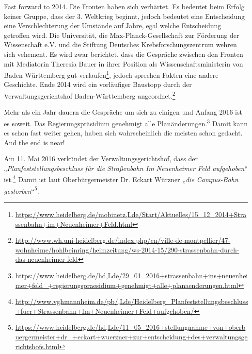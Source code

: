 Fast forward to 2014. Die Fronten haben sich verhärtet. Es bedeutet beim Erfolg keiner Gruppe, dass der 3. Weltkrieg beginnt, jedoch bedeutet eine Entscheidung eine Verschlechterung der Umstände auf Jahre, egal welche Entscheidung getroffen wird. Die Universität, die Max-Planck-Gesellschaft zur Förderung der Wissenschaft e.V. und die Stiftung Deutsches Krebsforschungszentrum wehren sich vehement. Es wird zwar berichtet, dass die Gespräche zwischen den Fronten mit Mediatorin Theresia Bauer in ihrer Position als Wissenschaftsministerin von Baden-Württemberg gut verlaufen\footnote{\url{https://www.heidelberg.de/mobinetz,Lde/Start/Aktuelles/15_12_2014+Strassenbahn+im+Neuenheimer+Feld.html}}, jedoch sprechen Fakten eine andere Geschichte. Ende 2014 wird ein vorläufiger Baustopp durch der Verwaltungsgerichtshof Baden-Württemberg angeordnet.\footnote{\url{http://www.wh.uni-heidelberg.de/index.php/en/ville-de-montpellier/47-wohnheime/hohlbeinring/heimzeitung/ws-2014-15/290-strassenbahn-durch-das-neuenheimer-feld}}

Mehr als ein Jahr dauern die Gespräche um sich zu einigen und Anfang 2016 ist es soweit. Das Regierungspräsidium genehmigt alle Planänderungen.\footnote{\url{https://www.heidelberg.de/hd,Lde/29_01_2016+strassenbahn+ins+neuenheimer+feld_+regierungspraesidium+genehmigt+alle+planaenderungen.html}} Damit kann es schon fast weiter gehen, haben sich wahrscheinlich die meisten schon gedacht. And the end is near!

Am 11. Mai 2016 verkündet der Verwaltungsgerichtshof, dass der „\textit{Planfeststellungsbeschluss für die Straßenbahn Im Neuenheimer Feld aufgehoben}“ ist.\footnote{\url{http://www.vghmannheim.de/pb/,Lde/Heidelberg_Planfeststellungsbeschluss+fuer+Strassenbahn+Im+Neuenheimer+Feld+aufgehoben/}} Damit ist laut Oberbürgermeister Dr. Eckart Würzner „\textit{die Campus-Bahn gestorben}“\footnote{\url{https://www.heidelberg.de/hd,Lde/11_05_2016+stellungnahme+von+oberbuergermeister+dr_+eckart+wuerzner+zur+entscheidung+des+verwaltungsgerichtshofs.html}}.
